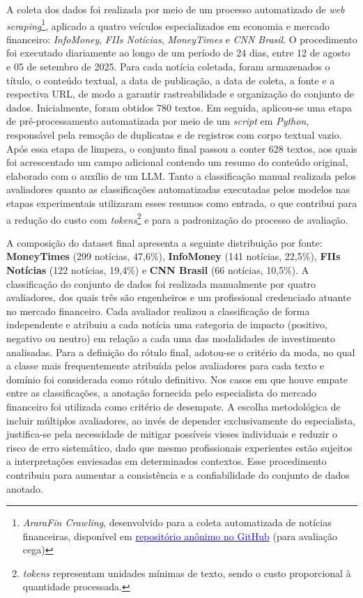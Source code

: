 \documentclass[12pt]{article}
\begin{document}
A coleta dos dados foi realizada por meio de um processo automatizado de \textit{web scraping}\footnote{\textit{AraraFin Crawling}, desenvolvido para a coleta automatizada de notícias financeiras, disponível em \href{https://github.com/pesquisador-anonimo/ararafin-crawling}{\textcolor{blue}{repositório anônimo no GitHub}} (para avaliação cega)}, aplicado a quatro veículos especializados em economia e mercado financeiro: \textit{InfoMoney}, \textit{FIIs Notícias}, \textit{MoneyTimes} e \textit{CNN Brasil}. O procedimento foi executado diariamente ao longo de um período de 24 dias, entre 12 de agosto e 05 de setembro de 2025. Para 
cada notícia coletada, foram armazenados o título, o conteúdo textual, a data de publicação, a data de coleta, a fonte e a respectiva URL, de modo a garantir rastreabilidade e organização 
do conjunto de dados. Inicialmente, foram obtidos 780 textos. Em seguida, aplicou-se uma etapa de pré-processamento automatizada por meio de um \textit{script} em \textit{Python}, responsável pela remoção de duplicatas e de registros com corpo textual vazio. Após essa etapa de limpeza, o conjunto final passou a conter 628 textos, aos quais foi acrescentado um campo adicional contendo um resumo do 
conteúdo original, elaborado com o auxílio de um LLM. Tanto a classificação manual realizada pelos avaliadores quanto as classificações automatizadas executadas pelos modelos
nas etapas experimentais utilizaram esses resumos como entrada, o que contribui para a redução do custo com \textit{tokens}\footnote{\textit{tokens} representam unidades mínimas 
de texto, sendo o custo proporcional à quantidade processada.} e para a padronização do processo de avaliação.

A composição do dataset final apresenta a seguinte distribuição por fonte: \textbf{MoneyTimes} (299 notícias, 47,6\%), \textbf{InfoMoney} (141 notícias, 22,5\%), \textbf{FIIs Notícias} (122 notícias, 19,4\%) e \textbf{CNN Brasil} (66 notícias, 10,5\%). A classificação do conjunto de dados foi realizada manualmente por quatro avaliadores, dos quais três são engenheiros e um profissional credenciado atuante no mercado financeiro. Cada avaliador realizou a classificação de forma independente e atribuiu a cada notícia uma categoria de impacto (positivo, negativo ou neutro) em relação a cada uma das modalidades de investimento analisadas. Para a definição do rótulo final, adotou-se o critério da moda, no qual a classe mais frequentemente atribuída pelos avaliadores para cada texto e domínio foi considerada como rótulo definitivo. Nos casos em que houve empate entre as classificações, a anotação fornecida pelo especialista do mercado financeiro foi utilizada como critério de desempate. 
A escolha metodológica de incluir múltiplos avaliadores, ao invés de depender exclusivamente do especialista, justifica-se pela necessidade de mitigar possíveis vieses
individuais e reduzir o risco de erro sistemático, dado que mesmo profissionais experientes estão sujeitos a interpretações enviesadas em determinados contextos. Esse procedimento contribuiu para aumentar a consistência e a confiabilidade do conjunto de dados anotado.
\end{document}
